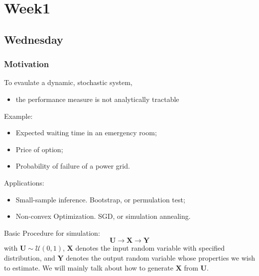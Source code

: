 
\chapter{Week1}

\section{Wednesday}

\subsection{Motivation}
To evaulate a dynamic, stochastic system,
\begin{itemize}
\item
the performance measure is not analytically tractable
\end{itemize}
Example:
\begin{itemize}
\item
Expected waiting time in an emergency room;
\item
Price of option;
\item
Probability of failure of a power grid.
\end{itemize}
Applications:
\begin{itemize}
\item
Small-sample inference.
Bootstrap, or permulation test;
\item
Non-convex Optimization.
SGD, or simulation annealing.
\end{itemize}
Basic Procedure for simulation:
\[
\bm U\to\bm X\to\bm Y
\]
with $\bm U\sim\mathcal{U}(0,1)$,
$\bm X$ denotes the input random variable with specified distribution,
and $\bm Y$ denotes the output random variable whose properties we wish to estimate.
We will mainly talk about how to generate $\bm X$ from $\bm U$.

